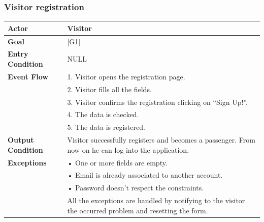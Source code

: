 \documentclass{article}
\begin{document}
\subsubsection{Visitor registration}
\begin{tabular}{| l | p{8cm} |}
\hline
\textbf{Actor}      &       Visitor \\
\hline
\textbf{Goal}       &       [G1]\\
\hline
\textbf{Entry Condition} &  NULL\\
\hline
\textbf{Event Flow}     &   1.	Visitor opens the registration page.\\&
                                            2.	Visitor fills all the fields.\\&
                                            3.	Visitor confirms the registration clicking on “Sign Up!”.\\&
                                            4.  The data is checked.\\&
                                            5.	The data is registered.\\
\hline
\textbf{Output Condition} & Visitor successfully registers and becomes a passenger. From now on he can log into the application.\\
\hline
\textbf{Exceptions} &       •   One or more fields are empty.\\& 
                            •	Email is already associated to another account.\\&
                            •	Password doesn't respect the constraints.\\& 
                            All the exceptions are handled by notifying to the visitor the occurred problem and resetting the form.\\
\hline
\end{tabular} 
\end{document}
